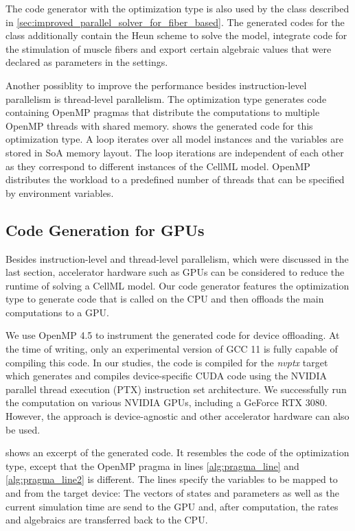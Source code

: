 The code generator with the  optimization type is also used by the  class described in \cref{sec:improved_parallel_solver_for_fiber_based}. The generated codes for the  class additionally contain the Heun scheme to solve the model, integrate code for the stimulation of muscle fibers and  export certain algebraic values that were declared as parameters in the settings.

Another possiblity to improve the performance besides instruction-level parallelism is thread-level parallelism. The  optimization type generates code containing OpenMP pragmas that distribute the computations to multiple OpenMP threads with shared memory.  shows the generated code for this optimization type. A loop iterates over all model instances and the variables are stored in SoA memory layout. The loop iterations are independent of each other as they correspond to different instances of the CellML model. OpenMP distributes the workload to a predefined number of threads that can be specified by environment variables.

\subsection{Code Generation for GPUs}

Besides instruction-level and thread-level parallelism, which were discussed in the last section, accelerator hardware such as GPUs can be considered to reduce the runtime of solving a CellML model.
Our code generator features the  optimization type to generate code that is called on the CPU and then offloads the main computations to a GPU.

We use OpenMP 4.5 to instrument the generated code for device offloading. At the time of writing, only an experimental version of GCC 11 is fully capable of compiling this code. In our studies, the code is compiled for the \emph{nvptx} target which generates and compiles device-specific CUDA code using the NVIDIA parallel thread execution (PTX) instruction set architecture. We successfully run the computation on various NVIDIA GPUs, including a GeForce RTX 3080. However, the approach is device-agnostic and other accelerator hardware can also be used.

 shows an excerpt of the generated code. It resembles the code of the\break{} optimization type, except that the OpenMP pragma in lines \ref{alg:pragma_line} and \ref{alg:pragma_line2} is different. The lines specify the variables to be mapped to and from the target device: The vectors of states and parameters as well as the current simulation time  are send to the GPU and, after computation, the rates and algebraics are transferred back to the CPU.

